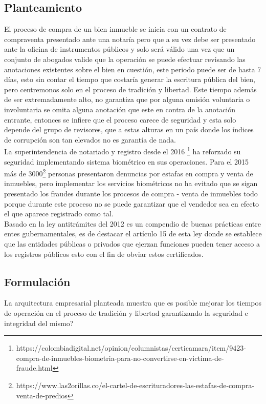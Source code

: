 \subsection{Planteamiento}

El proceso de compra de un bien inmueble se inicia con un contrato de compraventa presentado ante una notaría pero que a su vez debe ser presentado ante la oficina de instrumentos públicos y solo será válido una vez que un conjunto de abogados valide que la operación se puede efectuar revisando las anotaciones existentes sobre el bien en cuestión, este periodo puede ser de hasta 7 días, esto sin contar el tiempo que costaría generar la escritura pública del bien, pero centremonos solo en el proceso de tradición y libertad. Este tiempo además de ser extremadamente alto, no garantiza que por alguna omisión voluntaria o involuntaria se omita alguna anotación que este en contra de la anotación entrante, entonces se infiere que el proceso carece de seguridad y esta solo depende del grupo de revisores, que a estas alturas en un país donde los índices de corrupción son tan elevados no es garantía de nada. 
\\
 La superintendencia de notariado y registro desde el 2016 \footnote{https://colombiadigital.net/opinion/columnistas/certicamara/item/9423-compra-de-inmuebles-biometria-para-no-convertirse-en-victima-de-fraude.html} ha reforzado su seguridad implementando sistema biométrico en sus operaciones. Para el 2015 más de 3000\footnote{https://www.las2orillas.co/el-cartel-de-escrituradores-las-estafas-de-compra-venta-de-predios} personas presentaron denuncias por estafas en compra y venta de inmuebles, pero implementar los servicios biométricos no ha evitado que se sigan presentado los fraudes durante los procesos de compra - venta de inmuebles todo porque durante este proceso no se puede garantizar que el vendedor sea en efecto el que aparece registrado como tal.
 \\
Basado en la ley antitrámites del 2012 es un compendio de buenas prácticas entre entes gubernamentales, es de destacar el artículo 15 de esta ley donde se establece que las entidades públicas o privados que ejerzan funciones pueden tener acceso a los registros públicos esto con el fin de obviar estos certificados.


\subsection{Formulación}
La arquitectura empresarial planteada muestra que es posible mejorar los tiempos de operación en el proceso de tradición y libertad garantizando la seguridad e integridad del mismo?

